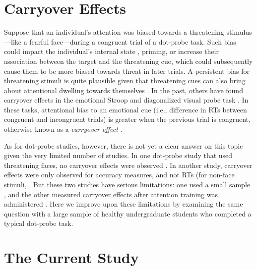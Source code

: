 \documentclass{article}
\begin{document}
	\section{Carryover Effects}



	Suppose that an individual's attention was biased towards a threatening stimulus—like a fearful face—during a congruent trial of a dot-probe task. Such bias could impact the {\color{4472C4}individual's internal state }\textcite{[object Object]}, priming,{\color{4472C4} or increase their association between the target and the threatening cue, which could subsequently cause }them to be more biased towards threat in later trials. A persistent bias for threatening stimuli is quite plausible given that threatening cues can also bring about attentional dwelling towards themselves \textcite{[object Object], [object Object]}. In the past, others have found carryover effects in the emotional Stroop \textcite{[object Object], [object Object], [object Object], [object Object]} and diagonalized visual probe task \textcite{[object Object], [object Object], [object Object]}. In these tasks, attentional bias to an emotional cue (i.e., difference in RTs between congruent and incongruent trials) is greater when the previous trial is congruent, otherwise known as a \emph{carryover effect }\textcite{[object Object]}.



	As for dot-probe studies,{\color{4472C4} however, there is not yet a clear answer on this topic given the very limited number of studies. }In one dot-probe study that used threatening faces, no carryover effects were observed \textcite{[object Object]}. In another study, carryover effects were only observed for accuracy measures, and not RTs (for non-face stimuli, \textcite{[object Object]}. But these two studies have serious limitations: one used a small sample \textcite{[object Object]}, and the other measured carryover effects after attention training was administered \textcite{[object Object]}. Here we improve upon these limitations by examining the same question with a large sample of healthy undergraduate students who completed a typical dot-probe task.



	\section{The Current Study}
\end{document}
